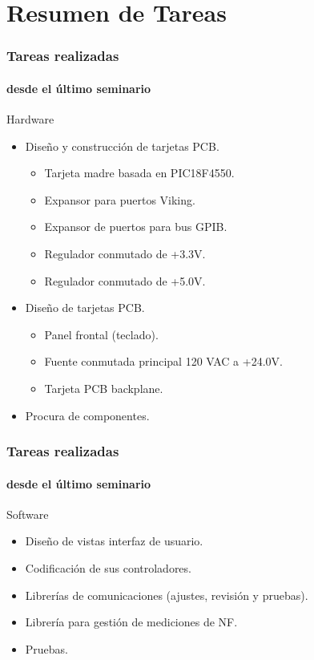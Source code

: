 \documentclass[xcolor=pdftext, table]{beamer}
\begin{document}
	\section{Resumen de Tareas}
	
		
		\begin{frame}	
			\frametitle{Tareas realizadas}			
			\framesubtitle{desde el último seminario}
			
			\begin{block}{Hardware}					
				\small
				\begin{itemize}
					\item Diseño y construcción de tarjetas PCB.	\\
					\begin{itemize}						
						\item Tarjeta madre basada en PIC18F4550.
						\item Expansor para puertos Viking.
						\item Expansor de puertos para bus GPIB.
						\item Regulador conmutado de +3.3V.
						\item Regulador conmutado de +5.0V.					
					\end{itemize}
					\item Diseño de tarjetas PCB.
					\begin{itemize}
						\item Panel frontal (teclado).
						\item Fuente conmutada principal 120 VAC a +24.0V.
						\item Tarjeta PCB backplane.
					\end{itemize}
					\item Procura de componentes.
				\end{itemize}	
			\end{block}	
					
		\end{frame}
		
		
		\begin{frame}
			\frametitle{Tareas realizadas}
			\framesubtitle{desde el último seminario}
			\begin{block}{Software}
				\small
				\begin{itemize}									
					\item Diseño de vistas interfaz de usuario.
					\item Codificación de sus controladores.
					\item Librerías de comunicaciones (ajustes, revisión y pruebas).
					\item Librería para gestión de mediciones de NF.
					\item Pruebas.
				\end{itemize}
			\end{block}			
		\end{frame}
		
\end{document}
